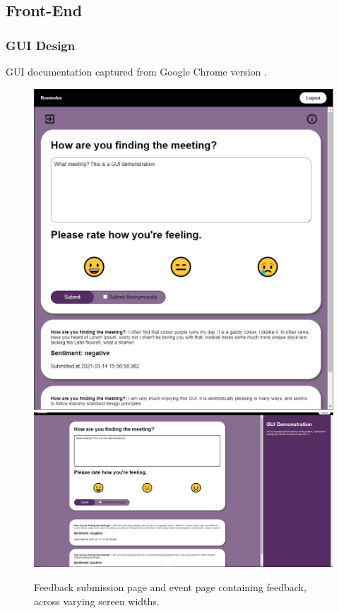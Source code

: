 \documentclass[9pt, titlepage]{extarticle}
\begin{document}
\subsection{Front-End} \label{sec:front-end}

\subsubsection{GUI Design}

GUI documentation captured from Google Chrome version .

\begin{figure}[H]
    \centering
  \includegraphics[width=.31\linewidth]{images/feedback_thin1.jpg}\hfill
  \includegraphics[width=.65\linewidth]{images/feedback_wide.jpg}\hfill
  \caption{Feedback submission page and event page containing feedback, across varying screen widths.}
  \label{fig:gui2}
\end{figure}
\end{document}
